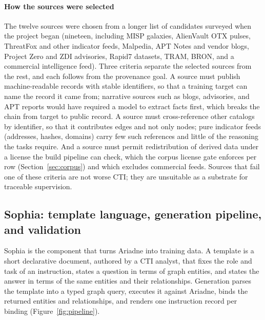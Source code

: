 \documentclass[a4paper,fleqn]{cas-dc}
\begin{document}
\paragraph{How the sources were selected}
The twelve sources were chosen from a longer list of candidates surveyed when the project began (nineteen, including MISP galaxies, AlienVault OTX pulses, ThreatFox and other indicator feeds, Malpedia, APT Notes and vendor blogs, Project Zero and ZDI advisories, Rapid7 datasets, TRAM, BRON, and a commercial intelligence feed). Three criteria separate the selected sources from the rest, and each follows from the provenance goal. A source must publish machine-readable records with stable identifiers, so that a training target can name the record it came from; narrative sources such as blogs, advisories, and APT reports would have required a model to extract facts first, which breaks the chain from target to public record. A source must cross-reference other catalogs by identifier, so that it contributes edges and not only nodes; pure indicator feeds (addresses, hashes, domains) carry few such references and little of the reasoning the tasks require. And a source must permit redistribution of derived data under a license the build pipeline can check, which the corpus license gate enforces per row (Section~\ref{sec:corpus}) and which excludes commercial feeds. Sources that fail one of these criteria are not worse CTI; they are unsuitable as a substrate for traceable supervision.

\subsection{Sophia: template language, generation pipeline, and validation}\label{sec:sophia}
Sophia is the component that turns Ariadne into training data. A template is a short declarative document, authored by a CTI analyst, that fixes the role and task of an instruction, states a question in terms of graph entities, and states the answer in terms of the same entities and their relationships. Generation parses the template into a typed graph query, executes it against Ariadne, binds the returned entities and relationships, and renders one instruction record per binding (Figure~\ref{fig:pipeline}).
\end{document}
